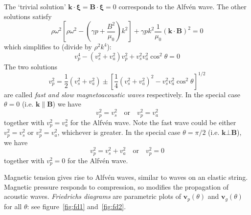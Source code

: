 \documentclass{jknotes}
\newcommand{\B}{\symbf{B}}
\newcommand{\disp}{\symbf{\xi}}
\renewcommand{\v}{\symbf{v}}
\begin{document}
The `trivial solution' $\symbf{k}\cdot\disp = \B \cdot \disp = 0$ corresponds
to the Alfv\'{e}n wave. The other solutions satisfy
\begin{equation}
	\rho \omega^2 \left[
	\rho \omega^2 - \left( \gamma p + \frac{B^2}{\mu_0}\right)k^2 \right] +
	\gamma p k^2 \frac{1}{\mu_0}(\symbf{k}\cdot\B)^2 = 0
\end{equation}
which simplifies to (divide by $\rho^2 k^4$):
\begin{equation}
	v_p^4 - (v_s^2 + v_a^2)v_p^2 + v_s^2 v_a^2 \cos^2 \theta = 0
\end{equation}
The two solutions
\begin{equation}
	v_p^2 = \frac{1}{2}(v_s^2 + v_a^2) \pm \left[ \frac{1}{4}(v_s^2+v_a^2)^2 -
	v_s^2 v_a^2 \cos^2 \theta \right]^{1/2}
\end{equation}
are called \emph{fast and slow magnetoacoustic waves} respectively.  In the
special case $\theta = 0$ (i.e. $\symbf{k}\parallel \B$) we have
\begin{equation}
	v_p^2 = v_s^2 \hspace{1em}\text{or}\hspace{1em} v_p^2 = v_a^2
\end{equation}
together with $v_p^2 = v_a^2$ for the Alfv\'{e}n wave. Note the fast wave
could be either $v_p^2 = v_s^2$ or $v_p^2 = v_a^2$, whichever is greater.  In
the special case $\theta = \pi/2$ (i.e. $\symbf{k}\bot\B$), we have
\begin{equation}
	v_p^2 = v_s^2 +v_a^2 \hspace{1em}\text{or}\hspace{1em} v_p^2 = 0
\end{equation}
together with $v_p^2 = 0$ for the Alfv\'{e}n wave.  

Magnetic tension gives rise to Alfv\'{e}n waves, similar to waves on an
elastic string. Magnetic pressure responds to compression, so modifies the
propagation of acoustic waves. \emph{Friedrichs diagrams} are parametric plots
of $\v_p(\theta)$ and $\v_g(\theta)$ for all $\theta$: see
figure~\ref{fig:fd1} and~\ref{fig:fd2}. 
\end{document}
